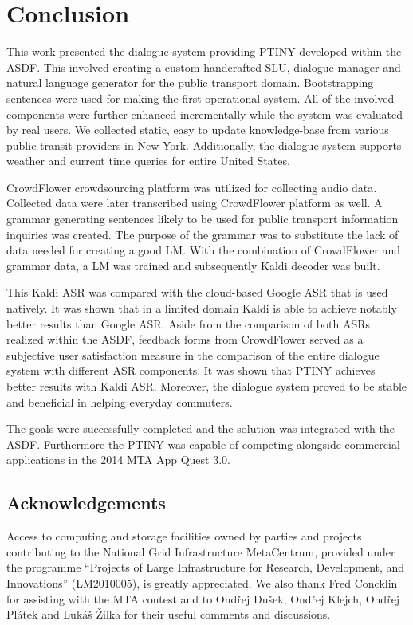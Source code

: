 \chapter*{Conclusion}

This work presented the dialogue system providing \acf{PTINY} developed within the \acf{ASDF}.
This involved creating a custom handcrafted \acf{SLU}, dialogue manager and natural language generator for the public transport domain.
Bootstrapping sentences were used for making the first operational system.
All of the involved components were further enhanced incrementally while the system was evaluated by real users.
We collected static, easy to update knowledge-base from various public transit providers in New York.
Additionally, the dialogue system supports weather and current time queries for entire United States.

CrowdFlower crowdsourcing platform was utilized for collecting audio data.
Collected data were later transcribed using CrowdFlower platform as well.
A grammar generating sentences likely to be used for public transport information inquiries was created.
The purpose of the grammar was to substitute the lack of data needed for creating a good \acf{LM}.
With the combination of CrowdFlower and grammar data, a \ac{LM} was trained and subsequently Kaldi decoder was built.

This Kaldi \ac{ASR} was compared with the cloud-based Google \ac{ASR} that is used natively.
It was shown that in a limited domain Kaldi is able to achieve notably better results than Google \ac{ASR}.
Aside from the comparison of both \acp{ASR} realized within the \ac{ASDF}, feedback forms from CrowdFlower served as a subjective user satisfaction measure in the comparison of the entire dialogue system with different \ac{ASR} components.
It was shown that \ac{PTINY} achieves better results with Kaldi \ac{ASR}.
Moreover, the dialogue system proved to be stable and beneficial in helping everyday commuters.

The goals were successfully completed and the solution was integrated with the \ac{ASDF}.
Furthermore the \ac{PTINY} was capable of competing alongside commercial applications in the 2014 \ac{MTA} App Quest 3.0.


\section{Acknowledgements}

Access to computing and storage facilities owned by parties and projects contributing to the National Grid Infrastructure MetaCentrum, provided under the programme ``Projects of Large Infrastructure for Research, Development, and Innovations'' (LM2010005), is greatly appreciated. We also thank Fred Concklin for assisting with the \ac{MTA} contest and to Ondřej Dušek, Ondřej Klejch, Ondřej Plátek and Lukáš Žilka for their useful comments and discussions.

